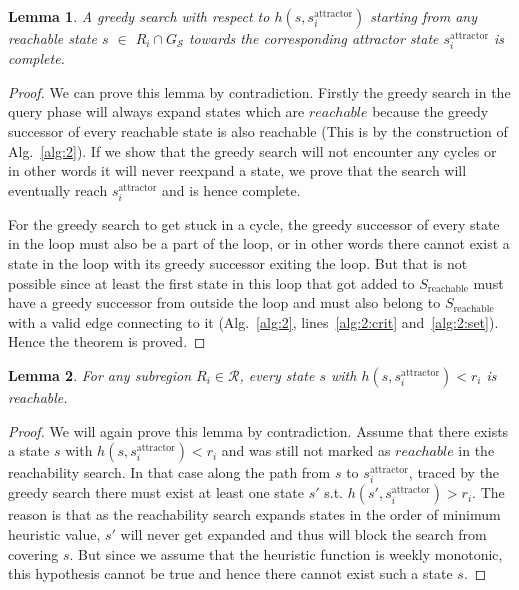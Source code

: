 \documentclass[letterpaper]{article} %
\newcommand{\calS}{\ensuremath{\mathcal{S}}\xspace}
\newcommand{\calR}{\ensuremath{\mathcal{R}}\xspace}
\newcommand{\sAttract}{\ensuremath{s^{\text{attractor}}_i}\xspace}
\newtheorem{lemma}{Lemma}
\begin{document}
\begin{lemma}
\label{lemma:1}
A greedy search with respect to $h(s, \sAttract)$ starting from any reachable state $s$ $\in$ $R_i \cap G_\calS$ towards the corresponding attractor state $\sAttract$ is complete.
\end{lemma}

\begin{proof}
We can prove this lemma by contradiction. Firstly the greedy search in the query phase will always expand states which are $reachable$ because the greedy successor of every reachable state is also reachable (This is by the construction of Alg.~\ref{alg:2}). If we show that the greedy search will not encounter any cycles or in other words it will never reexpand a state, we prove that the search will eventually reach $\sAttract$ and is hence complete.


For the greedy search to get stuck in a cycle, the greedy successor of every state in the loop must also be a part of the loop, or in other words there cannot exist a state in the loop with its greedy successor exiting the loop. But that is not possible since at least the first state in this loop that got added to $S_{\text{reachable}}$ must have a greedy successor from outside the loop and must also belong to $S_{\text{reachable}}$ with a valid edge connecting to it (Alg.~\ref{alg:2}, lines~\ref{alg:2:crit} and~\ref{alg:2:set}). Hence the theorem is proved.
\end{proof}

\begin{lemma}
\label{lemma:2}
For any subregion $R_i \in \calR$, every state $s$ with $h(s,\sAttract) < r_i$ is reachable.
\end{lemma}

\begin{proof}
We will again prove this lemma by contradiction. Assume that there exists a state $s$ with $h(s,\sAttract) < r_i$ and was still not marked as $reachable$ in the reachability search. In that case along the path from $s$ to $\sAttract$, traced by the greedy search there must exist at least one state $s'$ s.t. $h(s',\sAttract) > r_i$. The reason is that as the reachability search expands states in the order of minimum heuristic value, $s'$ will never get expanded and thus will block the search from covering $s$. But since we assume that the heuristic function is weekly monotonic, this hypothesis cannot be true and hence there cannot exist such a state $s$.
\end{proof}
\end{document}
